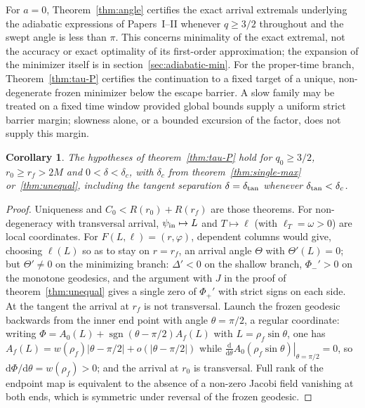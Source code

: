 \documentclass[aip,jmp,amsmath,amssymb,reprint]{revtex4-2}
\newcommand{\dd}{\mathrm{d}}
\theoremstyle{plain}
\newtheorem{corollary}[proposition]{Corollary}
\theoremstyle{definition}
\begin{document}
For $a=0$, Theorem~\ref{thm:angle} certifies the exact arrival extremals underlying the
adiabatic expressions of Papers~I--II whenever $q\ge3/2$ throughout and the swept angle is
less than $\pi$. This concerns minimality of the exact
extremal, not the accuracy or exact optimality of its first-order approximation; the expansion of
the minimizer itself is in section~\ref{sec:adiabatic-min}. For the
proper-time branch, Theorem~\ref{thm:tau-P} certifies the continuation to a fixed target of a
unique, non-degenerate frozen minimizer below the escape barrier. A slow family may be
treated on a fixed time window provided global bounds supply a uniform strict barrier
margin; slowness alone, or a bounded excursion of the factor, does not supply this margin.

\begin{corollary}\label{cor:tau-P}
The hypotheses of theorem~\ref{thm:tau-P} hold for $q_0\ge3/2$, $r_0\ge r_f>2M$ and
$0<\delta<\delta_c$, with $\delta_c$ from theorem~\ref{thm:single-max} or~\ref{thm:unequal},
including the tangent separation $\delta=\delta_{\rm tan}$ whenever $\delta_{\rm tan}<\delta_c$.
\end{corollary}

\begin{proof}
Uniqueness and $C_0<R(r_0)+R(r_f)$ are those theorems. For non-degeneracy with transversal
arrival, $\psi_{\rm in}\mapsto L$ and $T\mapsto\ell$ (with $\ell_T=\omega>0$) are local coordinates.
For $F(L,\ell)=(r,\varphi)$, dependent columns would give, choosing $\ell(L)$ so as to stay on
$r=r_f$, an arrival angle $\Theta$ with $\Theta'(L)=0$; but $\Theta'\neq0$ on the minimizing
branch: $\Delta'<0$ on the shallow branch, $\Phi_-'>0$ on the monotone geodesics, and the
argument with $J$ in the proof of theorem~\ref{thm:unequal} gives a single zero of $\Phi_+'$
with strict signs on each side. At the tangent the arrival at $r_f$ is not transversal.
Launch the frozen geodesic backwards from the inner end point with angle $\theta=\pi/2$, a
regular coordinate: writing $\Phi=A_0(L)+\operatorname{sgn}(\theta-\pi/2)A_f(L)$ with $L=\rho_f\sin\theta$, one has
$A_f(L)=w(\rho_f)|\theta-\pi/2|+o(|\theta-\pi/2|)$ while
$\left.\frac{\dd}{\dd\theta}A_0(\rho_f\sin\theta)\right|_{\theta=\pi/2}=0$, so
$\dd\Phi/\dd\theta=w(\rho_f)>0$; and the arrival at $r_0$ is transversal. Full rank of the endpoint map is equivalent to the absence of a non-zero
Jacobi field vanishing at both ends, which is symmetric under reversal of the frozen
geodesic.
\end{proof}
\end{document}
